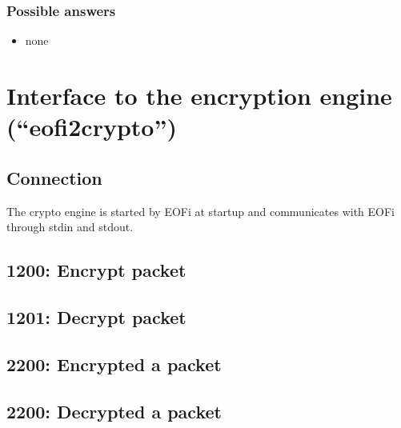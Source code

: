 \documentclass[12pt,a4paper]{book}
\begin{document}
\subsubsection{Possible answers}
\begin{itemize}
\item none
\end{itemize}
\section{Interface to the encryption engine ("`eofi2crypto"')}
\label{eofi2crypto}
\subsection{Connection}
The crypto engine is started by EOFi at startup and communicates with EOFi
through stdin and stdout.
\subsection{1200: Encrypt packet}
\subsection{1201: Decrypt packet}
\subsection{2200: Encrypted a packet}
\subsection{2200: Decrypted a packet}
\end{document}
